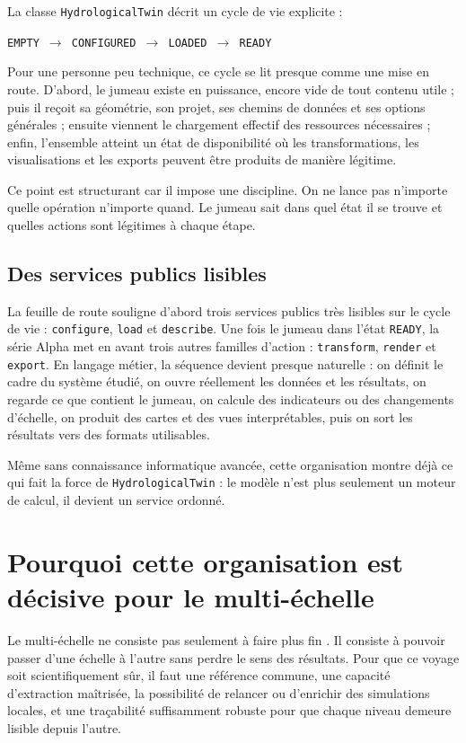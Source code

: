 \documentclass[11pt,a4paper]{article}
\newcommand{\hydrot}{\texttt{HydrologicalTwin}}
\begin{document}
La classe \texttt{HydrologicalTwin} décrit un cycle de vie explicite :

\begin{center}
\texttt{EMPTY $\rightarrow$ CONFIGURED $\rightarrow$ LOADED $\rightarrow$ READY}
\end{center}

Pour une personne peu technique, ce cycle se lit presque comme une mise en route. D'abord, le jumeau existe en puissance, encore vide de tout contenu utile ; puis il reçoit sa géométrie, son projet, ses chemins de données et ses options générales ; ensuite viennent le chargement effectif des ressources nécessaires ; enfin, l'ensemble atteint un état de disponibilité où les transformations, les visualisations et les exports peuvent être produits de manière légitime.

Ce point est structurant car il impose une discipline. On ne lance pas n'importe quelle opération n'importe quand. Le jumeau sait dans quel état il se trouve et quelles actions sont légitimes à chaque étape.

\subsection{Des services publics lisibles}

La feuille de route souligne d'abord trois services publics très lisibles sur le cycle de vie : \texttt{configure}, \texttt{load} et \texttt{describe}. Une fois le jumeau dans l'état \texttt{READY}, la série Alpha met en avant trois autres familles d'action : \texttt{transform}, \texttt{render} et \texttt{export}. En langage métier, la séquence devient presque naturelle : on définit le cadre du système étudié, on ouvre réellement les données et les résultats, on regarde ce que contient le jumeau, on calcule des indicateurs ou des changements d'échelle, on produit des cartes et des vues interprétables, puis on sort les résultats vers des formats utilisables.

Même sans connaissance informatique avancée, cette organisation montre déjà ce qui fait la force de \hydrot{} : le modèle n'est plus seulement un moteur de calcul, il devient un service ordonné.

\section{Pourquoi cette organisation est décisive pour le multi-échelle}

Le multi-échelle ne consiste pas seulement à faire \og plus fin \fg{}. Il consiste à pouvoir passer d'une échelle à l'autre sans perdre le sens des résultats. Pour que ce voyage soit scientifiquement sûr, il faut une référence commune, une capacité d'extraction maîtrisée, la possibilité de relancer ou d'enrichir des simulations locales, et une traçabilité suffisamment robuste pour que chaque niveau demeure lisible depuis l'autre.
\end{document}
